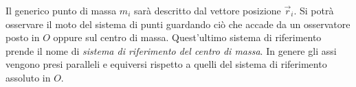 \documentclass[10pt,a4paper]{book}
\begin{document}
\begin{figure}[htpb]
\end{figure}
\FloatBarrier
Il generico punto di massa $m_i$ sarà descritto dal vettore posizione $\vec{r}_i$. Si potrà osservare il moto del sistema di punti guardando ciò che accade da un osservatore posto in $O$ oppure sul centro di massa. Quest'ultimo sistema di riferimento prende il nome di \emph{sistema di riferimento del centro di massa}. In genere gli assi vengono presi paralleli e equiversi rispetto a quelli del sistema di riferimento assoluto in $O$.
\end{document}
